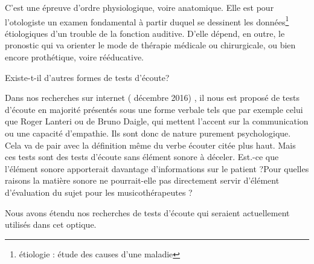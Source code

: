 C'est une épreuve d'ordre physiologique, voire anatomique. Elle
est pour l\textquoteright otologiste
un examen fondamental à partir duquel se dessinent les données\footnote{étiologie : étude des causes d'une maladie} étiologiques
d'un trouble de la fonction auditive. D'elle dépend, en outre, le
pronostic qui va orienter le mode de thérapie médicale ou chirurgicale,
ou bien encore prothétique, voire rééducative. 

Existe-t-il d'autres formes de tests d'écoute?

Dans nos recherches sur internet ( décembre 2016) , il nous est proposé
de tests d'écoute en majorité présentés sous une forme verbale tels
que par exemple celui que Roger Lanteri ou de Bruno Daigle, qui mettent
l'accent sur la communication ou une capacité d'empathie. Ils sont
donc de nature purement psychologique. Cela va de pair avec la définition
même du verbe écouter citée plus haut. Mais ces tests sont des tests
d'écoute sans élément sonore à déceler. Est.-ce que l'élément sonore
apporterait davantage d'informations sur le patient ?Pour quelles
raisons la matière sonore ne pourrait-elle pas directement servir
d'élément d'évaluation du sujet pour les musicothérapeutes ? 

Nous avons étendu nos recherches de tests d'écoute qui seraient actuellement
utilisés dans cet optique.

